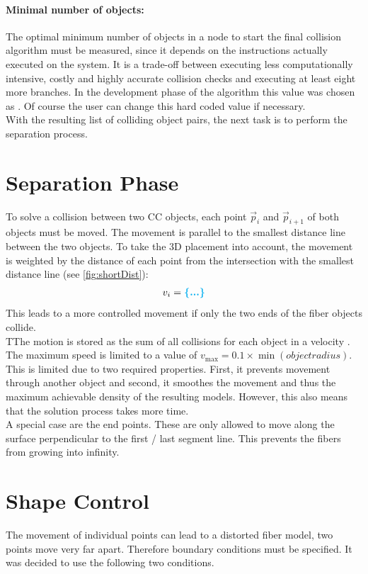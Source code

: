 \paragraph{Minimal number of objects:}
The optimal minimum number of objects in a node to start the final collision algorithm must be measured, since it depends on the instructions actually executed on the system.
It is a trade-off between executing less computationally intensive, costly and highly accurate collision checks and executing at least eight more branches.
In the development phase of the algorithm this value was chosen as .
Of course the user can change this hard coded value if necessary. 
\\
% 
With the resulting list of colliding object pairs, the next task is to perform the separation process.
%
\section{Separation Phase}
To solve a collision between two \ac{CC} objects, each point $\vec{p}_i$ and $\vec{p}_{i+1}$ of both objects must be moved.
The movement is parallel to the smallest distance line between the two objects.
To take the 3D placement into account, the movement is weighted by the distance of each point from the intersection with the smallest distance line (see \cref{fig:shortDist}):
\begin{align}
v_i = \dummy{}
\end{align}
This leads to a more controlled movement if \eg{} only the two ends of the fiber objects collide.
\\
% 
TThe motion is stored as the sum of all collisions for each object in a velocity .
The maximum speed is limited to a value of $v_{\max} = 0.1 \times \min(\mathit{object radius})$.
This is limited due to two required properties. First, it prevents movement through another object and second, it smoothes the movement and thus the maximum achievable density of the resulting models.
However, this also means that the solution process takes more time.
\\
% 
A special case are the end points.
These are only allowed to move along the surface perpendicular to the first / last segment line.
This prevents the fibers from growing into infinity.
% 
\section{Shape Control}\label{chap5:ShapeControl}
The movement of individual points can lead to a distorted fiber model, \eg{} two points move very far apart.
Therefore boundary conditions must be specified.
It was decided to use the following two conditions.
% 
